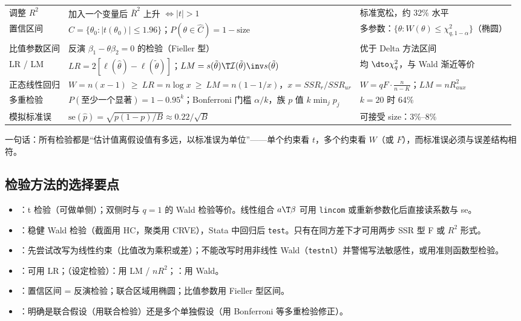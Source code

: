 {\begin{longtable}{p{2.6cm}p{7.9cm}p{4.9cm}}
调整 $R^2$ & 加入一个变量后 $\bar R^2$ 上升 $\iff|t|>1$ & 标准宽松，约 32\% 水平\\
置信区间 & $\hat C=\{\theta_0:|t(\theta_0)|\le1.96\}$；$P(\theta\in\hat C)=1-\text{size}$ & 多参数：$\{\theta:W(\theta)\le\chi^2_{q,1-\alpha}\}$（椭圆）\\
比值参数区间 & 反演 $\beta_1-\theta\beta_2=0$ 的检验（Fieller 型） & 优于 Delta 方法区间\\
LR / LM & $LR=2[\ell(\hat\theta)-\ell(\tilde\theta)]$；$LM=s(\tilde\theta)\T\mathcal I(\tilde\theta)\inv s(\tilde\theta)$ & 均 $\dto\chi^2_q$，与 Wald 渐近等价\\
正态线性回归 & $W=n(x-1)\ \ge\ LR=n\log x\ \ge\ LM=n(1-1/x)$，$x=SSR_r/SSR_{ur}$ & $W=qF\cdot\frac{n}{n-K}$；$LM=nR^2_{aux}$\\
多重检验 & $P(\text{至少一个显著})=1-0.95^k$；Bonferroni 门槛 $\alpha/k$，族 $p$ 值 $k\min_jp_j$ & $k=20$ 时 64\%\\
模拟标准误 & $\mathrm{se}(\hat p)=\sqrt{p(1-p)/B}\approx0.22/\sqrt B$ & 可接受 size：3\%--8\%\\
\end{longtable}
}

一句话：所有检验都是“估计值离假设值有多远，以标准误为单位”——单个约束看 $t$，多个约束看 $W$（或 $F$），而标准误必须与误差结构相符。

\subsection{检验方法的选择要点}

\begin{itemize}
  \item {}：t 检验（可做单侧）；双侧时与 $q=1$ 的 Wald 检验等价。线性组合 $a\T\beta$ 可用 \texttt{lincom} 或重新参数化后直接读系数与 se。
  \item {}：稳健 Wald 检验（截面用 HC，聚类用 CRVE），Stata 中回归后 \texttt{test}。只有在同方差下才可用两步 SSR 型 F 或 $R^2$ 形式。
  \item {}：先尝试改写为线性约束（比值改为乘积或差）；不能改写时用非线性 Wald（\texttt{testnl}）并警惕写法敏感性，或用准则函数型检验。
  \item {}：可用 LR；（设定检验）：用 LM / $nR^2$；：用 Wald。
  \item {}：置信区间 = 反演检验；联合区域用椭圆；比值参数用 Fieller 型区间。
  \item {}：明确是联合假设（用联合检验）还是多个单独假设（用 Bonferroni 等多重检验修正）。
\end{itemize}


